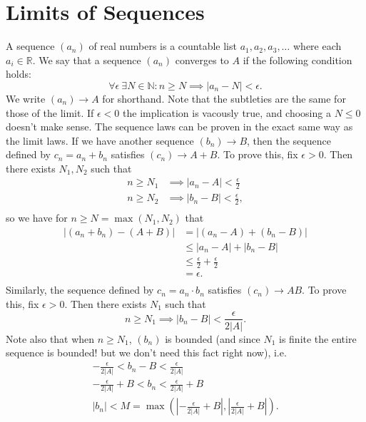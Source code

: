 \documentclass{article}[11pt]
\newcommand{\R}{\mathbb{R}}
\newcommand{\N}{\mathbb{N}}
\newcommand{\eps}{\epsilon}
\begin{document}
    \section{Limits of Sequences}
    A sequence $(a_n)$ of real numbers is a countable list $a_1, a_2, a_3, \dots$ where each $a_i \in \R$. We say that a sequence $(a_n)$ converges to $A$ if the following condition holds:
    $$ \forall \epsilon~\exists N \in \N : n \geq N \implies |a_n - N| < \eps .$$
    We write $(a_n) \to A$ for shorthand. Note that the subtleties are the same for those of the limit. If $\eps < 0$ the implication is vacously true, and choosing a $N \leq 0$ doesn't make sense. The sequence laws can be proven in the exact same way as the limit laws. If we have another sequence $(b_n) \to B$, then the sequence defined by $c_n = a_n + b_n$ satisfies $(c_n) \to A + B$. To prove this, fix $\eps > 0$. Then there exists $N_1, N_2$ such that
    \begin{align*}
        n \geq N_1 &\implies |a_n - A| < \frac{\eps}{2} \\
        n \geq N_2 &\implies |b_n - B| < \frac{\eps}{2} ,\\
    \end{align*} 
    so we have for $n \geq N = \max(N_1, N_2)$ that
    \begin{align*}
        |(a_n + b_n) - (A + B)| &= |(a_n - A) + (b_n - B)| \\
                              &\leq |a_n - A| + |b_n - B| \\
                              &\leq \frac{\eps}{2} + \frac{\eps}{2} \\
                              &= \eps. \\
    \end{align*}
    Similarly, the sequence defined by $c_n = a_n \cdot b_n$ satisfies $(c_n) \to AB$. To prove this, fix $\eps > 0$. Then there exists $N_1$ such that
    $$ n \geq N_1 \implies |b_n - B| < \frac{\eps}{2|A|} .$$
    Note also that when $n \geq N_1$, $(b_n)$ is bounded (and since $N_1$ is finite the entire sequence is bounded! but we don't need this fact right now), i.e.
    \begin{align*}
        -\frac{\eps}{2|A|} < b_n - B < \frac{\eps}{2|A|} \\
        -\frac{\eps}{2|A|} + B < b_n < \frac{\eps}{2|A|} + B \\
        |b_n| < M = \max\left(\left| -\frac{\eps}{2|A|} + B \right|, \left| \frac{\eps}{2|A|} + B \right|\right) . \\
    \end{align*}
\end{document}

